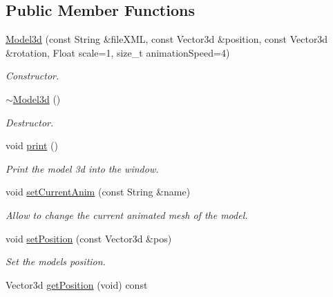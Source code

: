 \subsection*{Public Member Functions}
\begin{DoxyCompactItemize}
\item 
\hyperlink{classModel3d_a3382c1519f85b695a1d98b492207c339}{Model3d} (const String \&file\+X\+ML, const Vector3d \&position, const Vector3d \&rotation, Float scale=1, size\+\_\+t animation\+Speed=4)
\begin{DoxyCompactList}\small\item\em Constructor. \end{DoxyCompactList}\item 
\mbox{\label{classModel3d_a7a4ec3be34c901538574d99d95a46b04}} 
\hyperlink{classModel3d_a7a4ec3be34c901538574d99d95a46b04}{$\sim$\+Model3d} ()
\begin{DoxyCompactList}\small\item\em Destructor. \end{DoxyCompactList}\item 
\mbox{\label{classModel3d_ab1d6c9347c05323f85e5decb7e73cd1e}} 
void \hyperlink{classModel3d_ab1d6c9347c05323f85e5decb7e73cd1e}{print} ()
\begin{DoxyCompactList}\small\item\em Print the model 3d into the window. \end{DoxyCompactList}\item 
void \hyperlink{classModel3d_a29eeaa6769b0c21268f4704ac2d404b7}{set\+Current\+Anim} (const String \&name)
\begin{DoxyCompactList}\small\item\em Allow to change the current animated mesh of the model. \end{DoxyCompactList}\item 
void \hyperlink{classModel3d_a971b77ce978903443e71187ceafa1528}{set\+Position} (const Vector3d \&pos)
\begin{DoxyCompactList}\small\item\em Set the model\textquotesingle{}s position. \end{DoxyCompactList}\item 
\mbox{\label{classModel3d_ac40de3ff1527b92c7eadc80766c87824}} 
Vector3d \hyperlink{classModel3d_ac40de3ff1527b92c7eadc80766c87824}{get\+Position} (void) const

\end{DoxyCompactItemize}
